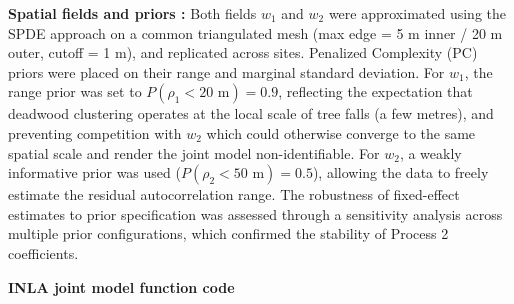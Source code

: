 \documentclass[
  letterpaper,
  DIV=11,
  numbers=noendperiod]{scrartcl}
\begin{document}
\textbf{Spatial fields and priors :} Both fields \(w_1\) and \(w_2\)
were approximated using the SPDE approach on a common triangulated mesh
(max edge = 5 m inner / 20 m outer, cutoff = 1 m), and replicated across
sites. Penalized Complexity (PC) priors were placed on their range and
marginal standard deviation. For \(w_1\), the range prior was set to
\(P(\rho_1 < 20\text{ m}) = 0.9\), reflecting the expectation that
deadwood clustering operates at the local scale of tree falls (a few
metres), and preventing competition with \(w_2\) which could otherwise
converge to the same spatial scale and render the joint model
non-identifiable. For \(w_2\), a weakly informative prior was used
(\(P(\rho_2 < 50\text{ m}) = 0.5\)), allowing the data to freely
estimate the residual autocorrelation range. The robustness of
fixed-effect estimates to prior specification was assessed through a
sensitivity analysis across multiple prior configurations, which
confirmed the stability of Process 2 coefficients.

\textbf{INLA joint model function code}
\end{document}

